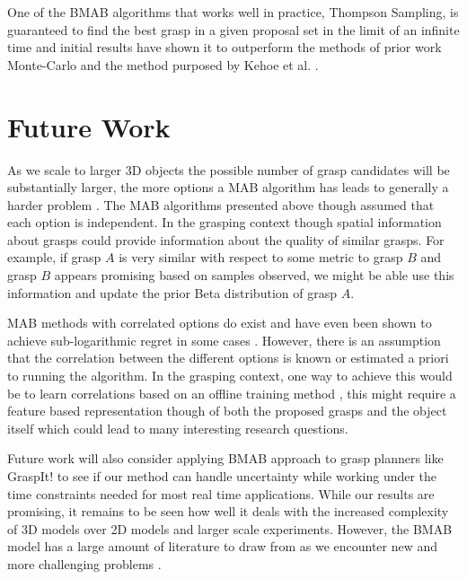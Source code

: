 \documentclass[journal,transmag]{IEEEtran}%
\begin{document}
One of the BMAB algorithms that works well in practice, Thompson Sampling, is guaranteed to find the best grasp in a given proposal set in the limit of an infinite time \cite{agrawal2011analysis} and initial results have shown it to outperform the methods of prior work Monte-Carlo and the method purposed by Kehoe et al. \cite{kehoe2012estimating}. 



\section{Future Work}

As we scale to larger 3D objects the possible number of grasp candidates will be substantially larger, the more options a MAB algorithm has leads to generally a harder problem \cite{bubeck2009pure}. The MAB algorithms presented above though assumed that each option is independent. In the grasping context though spatial information about grasps could provide information about the quality of similar grasps. For example, if grasp $A$ is very similar with respect to some metric to grasp $B$ and grasp $B$ appears promising based on samples observed, we might be able use this information and update the prior Beta distribution of grasp $A$.

MAB methods with correlated options do exist and have even been shown to achieve sub-logarithmic regret in some cases \cite{reverdy2014modeling}. However, there is an assumption that the correlation between the different options is known or estimated  a priori to running the algorithm. In the grasping context, one way to achieve this would be to learn correlations based on an offline training method \cite{andrieu2003introduction}, this might require a feature based representation though of both the proposed grasps and the object itself which could lead to many interesting research questions.

Future work will also consider applying BMAB approach to grasp planners like GraspIt! \cite{miller2004graspit} to see if our method can handle uncertainty while working under the time constraints needed for most real time applications. While our results are promising, it remains to be seen how well it deals with the increased complexity of 3D models over 2D models and larger scale experiments. However, the BMAB model has a large amount of literature to draw from as we encounter new and more challenging problems \cite{bergemann2006bandit}.




\end{document}
